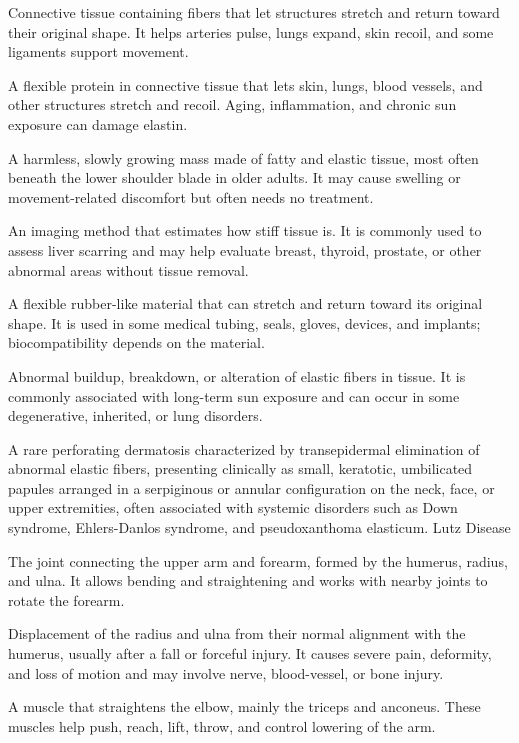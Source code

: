 Connective tissue containing fibers that let structures stretch and return toward their original shape. It helps arteries pulse, lungs expand, skin recoil, and some ligaments support movement.

 A flexible protein in connective tissue that lets skin, lungs, blood vessels, and other structures stretch and recoil. Aging, inflammation, and chronic sun exposure can damage elastin.

 A harmless, slowly growing mass made of fatty and elastic tissue, most often beneath the lower shoulder blade in older adults. It may cause swelling or movement-related discomfort but often needs no treatment.

 An imaging method that estimates how stiff tissue is. It is commonly used to assess liver scarring and may help evaluate breast, thyroid, prostate, or other abnormal areas without tissue removal.

 A flexible rubber-like material that can stretch and return toward its original shape. It is used in some medical tubing, seals, gloves, devices, and implants; biocompatibility depends on the material.

 Abnormal buildup, breakdown, or alteration of elastic fibers in tissue. It is commonly associated with long-term sun exposure and can occur in some degenerative, inherited, or lung disorders.

 A rare perforating dermatosis characterized by transepidermal elimination of abnormal elastic fibers, presenting clinically as small, keratotic, umbilicated papules arranged in a serpiginous or annular configuration on the neck, face, or upper extremities, often associated with systemic disorders such as Down syndrome, Ehlers-Danlos syndrome, and pseudoxanthoma elasticum.
\synonyms
Lutz Disease

 The joint connecting the upper arm and forearm, formed by the humerus, radius, and ulna. It allows bending and straightening and works with nearby joints to rotate the forearm.

 Displacement of the radius and ulna from their normal alignment with the humerus, usually after a fall or forceful injury. It causes severe pain, deformity, and loss of motion and may involve nerve, blood-vessel, or bone injury.

 A muscle that straightens the elbow, mainly the triceps and anconeus. These muscles help push, reach, lift, throw, and control lowering of the arm.

